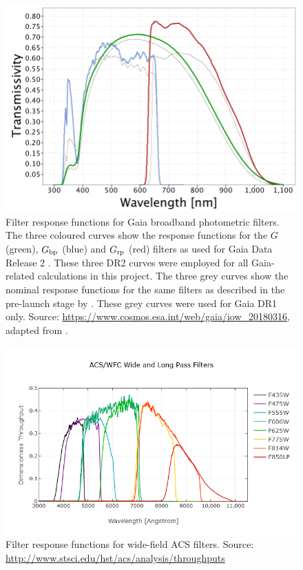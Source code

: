 \documentclass[12pt, a4paper]{report}
\begin{document}
\begin{figure}[h!]
\begin{center}
\includegraphics[width=1.0\textwidth]{GaiaDR2Passbands.png}
\caption{Filter response functions for Gaia broadband photometric filters. The three coloured curves show the response functions for the $G$ (green), $G_{\textnormal{bp}}$ (blue) and $G_{\textnormal{rp}}$ (red) filters as used for Gaia Data Release 2 \citep{2018A&A...616A...4E}. These three DR2 curves were employed for all Gaia-related calculations in this project. The three grey curves show the nominal response functions for the same filters as described in the pre-launch stage by \cite{2010A&A...523A..48J}. These grey curves were used for Gaia DR1 only. Source: \protect\url{https://www.cosmos.esa.int/web/gaia/iow_20180316}, adapted from \cite{2018A&A...616A...4E}.}
\label{Gaia_response_funcs}
\end{center}
\end{figure}

\begin{figure}[h!]
\begin{center}
\includegraphics[width=1.0\textwidth]{ACS_Wide.png}
\caption{Filter response functions for wide-field ACS filters. Source: \protect\url{http://www.stsci.edu/hst/acs/analysis/throughputs}}
\label{ACS_response_funcs}
\end{center}
\end{figure}
\end{document}
